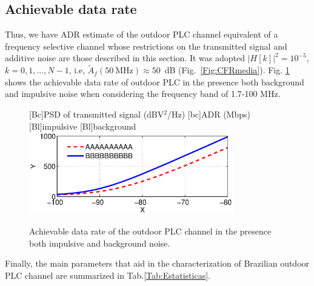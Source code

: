 \documentclass[journal]{IEEEtran}
\newcommand{\tamfig}{3.5in}    %
\begin{document}
	\subsection{Achievable data rate}
	Thus, we have \ac{ADR} estimate of the outdoor \ac{PLC} channel equivalent of a frequency selective channel whose restrictions on the transmitted signal and additive noise are those described in this section. It was adopted $|H[k]|^2 = 10^{-5}$, $k=0,1,\ldots,N-1$, i.e, $\widetilde{A}_f(50\ \mbox{MHz}) \approx  50$~dB (Fig.~\ref{Fig:CFRmedia}). Fig. \ref{Fig:Capacidade} shows the achievable data rate of outdoor PLC in the presence both background and impulsive noise when considering the frequency band of 1.7-100 MHz.
	\begin{figure}[!htp]
		\begin{centering}
			[Bc]{PSD of transmitted signal (dBV$^2$/Hz)}    
			[bc]{ADR (Mbps)}
			[Bl]{impulsive}
			[Bl]{background}
			\includegraphics[width=\tamfig]{Figuras/Capacidade.eps}
			\caption{Achievable data rate of the outdoor \ac{PLC} channel in the presence both impulsive and background noise.}
			\label{Fig:Capacidade}
		\end{centering}
	\end{figure} 
	
	Finally, the main parameters that aid in the characterization of Brazilian outdoor PLC channel are summarized in Tab.\ref{Tab:Estatisticas}.
	
\end{document}
